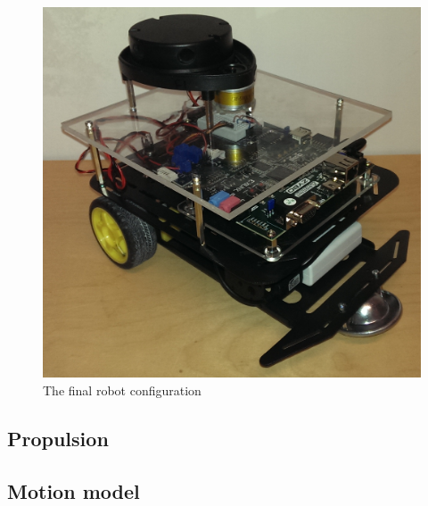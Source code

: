 \documentclass[Main]{subfiles}
\begin{document}
\begin{figure}[H]
	\centering
	\includegraphics[scale=0.3]{./Figures/final_robot.png}
	\caption{The final robot configuration}
	\label{fig:final_robot}
\end{figure}\noindent


	\subsection{Propulsion} %
		\label{sub:propulsion}
		

	\subsection{Motion model} %
		\label{sub:motion_model}
		

\end{document}
